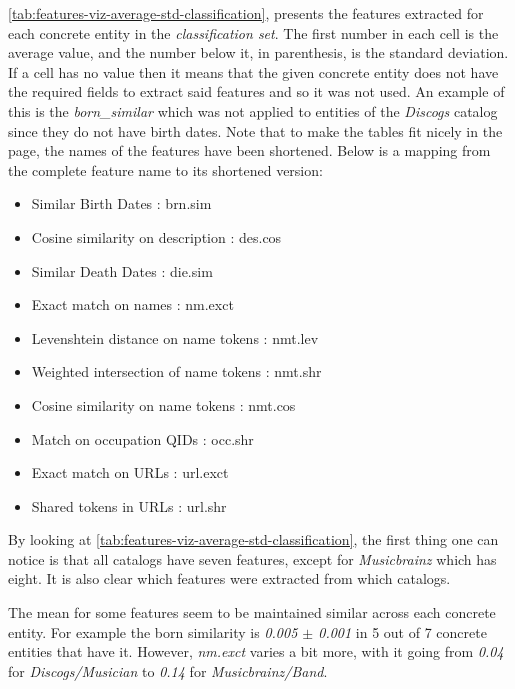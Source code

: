 \documentclass[epsfig,a4paper,11pt,titlepage,twoside,openany]{book}
\begin{document}
\autoref{tab:features-viz-average-std-classification}, presents the features extracted for each concrete entity in the \textit{classification set}. The first number in each cell is the average value, and the number below it, in parenthesis, is the standard deviation. If a cell has no value then it means that the given concrete entity does not have the required fields to extract said features and so it was not used. An example of this is the \textit{born\_similar} which was not applied to entities of the \textit{Discogs} catalog since they do not have birth dates. Note that to make the tables fit nicely in the page, the names of the features have been shortened. Below is a mapping from the complete feature name to its shortened version:

\begin{itemize}
    \item Similar Birth Dates : brn.sim
    \item Cosine similarity on description : des.cos
    \item Similar Death Dates : die.sim
    \item Exact match on names : nm.exct
    \item Levenshtein distance on name tokens : nmt.lev 
    \item Weighted intersection of name tokens : nmt.shr
    \item Cosine similarity on name tokens : nmt.cos
    \item Match on occupation QIDs : occ.shr
    \item Exact match on URLs : url.exct
    \item Shared tokens in URLs : url.shr 
\end{itemize}

By looking at \autoref{tab:features-viz-average-std-classification}, the first thing one can notice is that all catalogs have seven features, except for \textit{Musicbrainz} which has eight. It is also clear which features were extracted from which catalogs. 

The mean for some features seem to be maintained similar across each concrete entity. For example the born similarity is \textit{0.005 $\pm$ 0.001} in 5 out of 7 concrete entities that have it. However, \textit{nm.exct} varies a bit more, with it going from \textit{0.04} for \textit{Discogs/Musician} to \textit{0.14} for \textit{Musicbrainz/Band}. 

\end{document}
